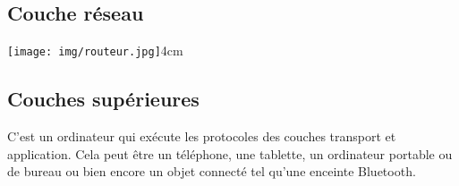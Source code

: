 \documentclass[a4paper,12pt]{book}
\begin{document}
\subsection*{Couche réseau}

{\texttt{[image: img/routeur.jpg]}}{4cm}

\subsection*{Couches supérieures}

C'est un ordinateur qui exécute les protocoles des couches transport et application. Cela peut être un téléphone, une tablette, un ordinateur portable ou de bureau ou bien encore un objet connecté tel qu'une enceinte Bluetooth.
\end{document}
